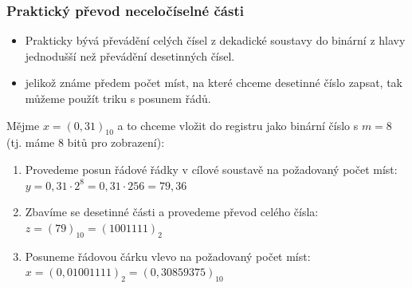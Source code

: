   \begin{frame}
    \frametitle{Praktický převod neceločíselné části}
		\small
		\boldmath
		\begin{itemize}
			\item Prakticky bývá převádění celých čísel z dekadické soustavy do binární z hlavy jednodušší než převádění desetinných čísel.
			\item jelikož známe předem počet míst, na které chceme desetinné číslo zapsat, tak můžeme použít triku s posunem řádů.
		\end{itemize}
		
		\vspace{4mm}
		Mějme $x = (0,31)_{10}$ a to chceme vložit do registru jako binární číslo s ${m} = 8$ (tj. máme 8 bitů pro zobrazení):
		
		
		\begin{enumerate}
			\item Provedeme posun řádové řádky v cílové soustavě na požadovaný počet míst:\\
			$y = 0,31\cdot 2^8 = 0,31 \cdot 256 = 79,36$
			\item Zbavíme se desetinné části a provedeme převod celého čísla:\\
			$z =(79)_{10} = (1001111)_{2}$
			\item Posuneme řádovou čárku vlevo na požadovaný počet míst:\\
			$x = (0,01001111)_{2} = (0,30859375)_{10}$
		\end{enumerate}
		
	\end{frame}